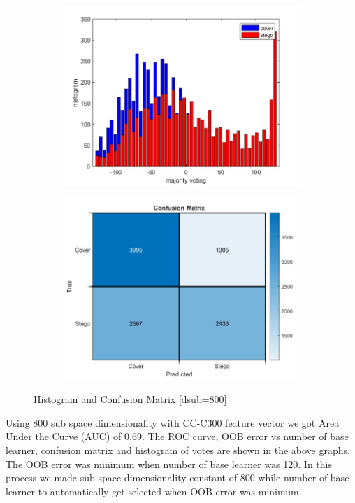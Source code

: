\begin{figure}[H]
    \begin{subfigure}[b]{0.5\textwidth}
        \includegraphics[width=\textwidth]{img/800/histogramgray.jpg}
    \end{subfigure}
    \hfill
    \begin{subfigure}[b]{0.5\textwidth}
        \includegraphics[width=\textwidth]{img/800/confusegray.jpg}
    \end{subfigure}
    \caption{Histogram and Confusion Matrix [dsub=800]}
\end{figure}
Using 800 sub space dimensionality with CC-C300 feature vector we got Area Under the Curve (AUC) of 0.69. The ROC curve, OOB error vs number of base learner, confusion matrix and histogram of votes are shown in the above graphs. The OOB error was minimum when number of base learner was 120. In this process we made sub space dimensionality constant of 800 while number of base learner to automatically get selected when OOB error was minimum.
